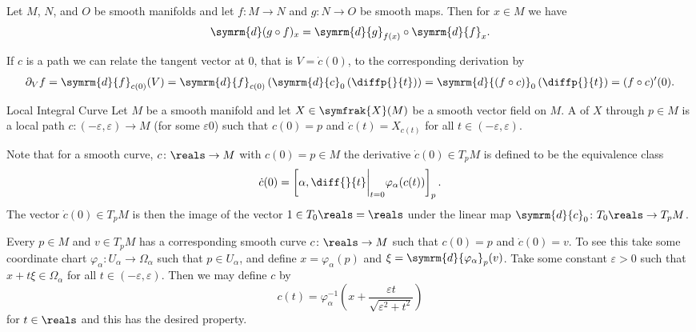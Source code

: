 \documentclass[fleqn]{NotesClass}
\renewcommand{\dl}{\symrm{d}}
\newcommand{\vectorFields}{\symfrak{X}}
\begin{document}
    \begin{prp}{}{}
        Let \(M\), \(N\), and \(O\) be smooth manifolds and let \(f \colon M \to N\) and \(g \colon N \to O\) be smooth maps.
        Then for \(x \in M\) we have
        \begin{equation}
            \dl (g \circ f)_x = \dl{g}_{f(x)} \circ \dl{f}_x.
        \end{equation}
    \end{prp}
    
    If \(c\) is a path we can relate the tangent vector at 0, that is \(V = \dot{c}(0)\), to the corresponding derivation by
    \begin{equation}
        \partial_V f = \dl{f}_{c(0)}(V) = \dl{f}_{c(0)}\left( \dl{c}_0\left( \diffp{}{t} \right) \right) = \dl{(f \circ c)}_0 \left( \diffp{}{t} \right) = (f \circ c)'(0).
    \end{equation}
    
    \begin{dfn}{Local Integral Curve}{}
        Let \(M\) be a smooth manifold and let \(X \in \vectorFields(M)\) be a smooth vector field on \(M\).
        A  of \(X\) through \(p \in M\) is a local path \(c \colon (-\varepsilon, \varepsilon) \to M\) (for some \(\varepsilon 0\)) such that \(c(0) = p\) and \(\dot{c}(t) = X_{c(t)}\) for all \(t \in (-\varepsilon, \varepsilon)\).
    \end{dfn}
    
    Note that for a smooth curve, \(c \colon \reals \to M\) with \(c(0) = p \in M\) the derivative \(\dot{c}(0) \in T_pM\) is defined to be the equivalence class
    \begin{equation}
        \dot{c}(0) = \left[ \alpha, \diff{}{t}\bigg|_{t=0}\varphi_\alpha(c(t)) \right]_p.
    \end{equation}
    The vector \(\dot{c}(0) \in T_pM\) is then the image of the vector \(1 \in T_0\reals = \reals\) under the linear map \(\dl{c}_0 \colon T_0 \reals \to T_{p}M\).
    
    Every \(p \in M\) and \(v \in T_pM\) has a corresponding smooth curve \(c \colon \reals \to M\) such that \(c(0) = p\) and \(\dot{c}(0) = v\).
    To see this take some coordinate chart \(\varphi_\alpha \colon U_\alpha \to \Omega_\alpha\) such that \(p \in U_\alpha\), and define \(x = \varphi_\alpha(p)\) and \(\xi = \dl{\varphi_\alpha}_p(v)\).
    Take some constant \(\varepsilon > 0\) such that \(x + t\xi \in \Omega_\alpha\) for all \(t \in (-\varepsilon, \varepsilon)\).
    Then we may define \(c\) by
    \begin{equation}
        c(t) = \varphi_\alpha^{-1}\left( x + \frac{\varepsilon t}{\sqrt{\varepsilon^2 + t^2}} \right)
    \end{equation}
    for \(t \in \reals\) and this has the desired property.
    
\end{document}
